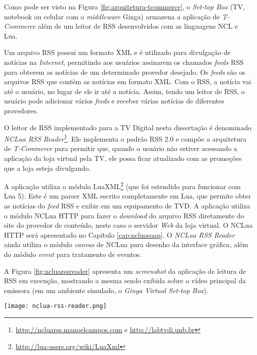 Como pode ser visto na Figura \ref{fig:arquitetura-tcommerce}, o \textit{Set-top Box} 
(TV, notebook ou celular com o \textit{middleware} Ginga)
armazena a aplicação de \textit{T-Commerce} além de um leitor de RSS 
desenvolvidos com as linguagens NCL e Lua.

Um arquivo RSS possui um formato XML e é utilizado para divulgação de notícias na \textit{Internet},
permitindo aos usuários assinarem os chamados \textit{feeds} RSS para
obterem as notícias de um determinado provedor desejado.
Os \textit{feeds} são os arquivos RSS que contêm as notícias em formato XML.
Com o RSS, a notícia vai até o usuário, no lugar de ele ir até a notícia.
Assim, tendo um leitor de RSS, o usuário pode adicionar vários \textit{feeds}
e receber várias notícias de diferentes provedores.

O leitor de RSS implementado para a TV Digital nesta dissertação é denominado 
\textit{NCLua RSS Reader}\footnote{\url{http://ncluarss.manoelcampos.com} e \url{http://labtvdi.unb.br}}.
Ele implementa o padrão RSS 2.0\cite{rss2} 
e compõe a arquitetura de \textit{T-Commerce} para permitir que, quando
o usuário não estiver acessando a aplicação da loja virtual pela TV, ele
possa ficar atualizado com as promoções que a loja esteja divulgando.

A aplicação utiliza o módulo LuaXML\footnote{\url{http://lua-users.org/wiki/LuaXml}} 
(que foi estendido para funcionar com Lua 5). Este é um parser XML escrito completamente
em Lua, que permite obter as notícias do \textit{feed} RSS e exibir em um equipamento de TVD.
A aplicação utiliza o módulo NCLua HTTP para fazer o \textit{download} do 
arquivo RSS diretamente do site do provedor de conteúdo, neste caso
o servidor \textit{Web} da loja virtual. O NCLua HTTP será apresentado no Capítulo \ref{cap:ncluasoap}.
O \textit{NCLua RSS Reader} ainda utiliza o módulo \textit{canvas} de NCLua para desenho 
da interface gráfica, além do módulo \textit{event} para tratamento de eventos.

A Figura \ref{fig:ncluarssreader} apresenta um \textit{screenshot} da aplicação de leitura de RSS em execução,
mostrando a mesma sendo exibida sobre o vídeo principal da emissora (em um ambiente
simulado, o \textit{Ginga Virtual Set-top Box}).

\begin{center}
	\texttt{[image: nclua-rss-reader.png]}
	\label{fig:ncluarssreader}
\end{center}

